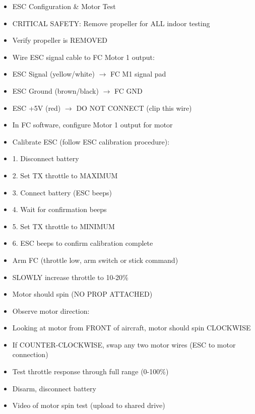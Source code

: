 \documentclass[11pt,letterpaper]{article}
\begin{document}
\begin{itemize}
  \item ESC Configuration \& Motor Test
  \item [WARNING] CRITICAL SAFETY: Remove propeller for ALL indoor testing
  \item Verify propeller is REMOVED
  \item Wire ESC signal cable to FC Motor 1 output:
  \item ESC Signal (yellow/white) $\rightarrow$ FC M1 signal pad
  \item ESC Ground (brown/black) $\rightarrow$ FC GND
  \item ESC +5V (red) $\rightarrow$ DO NOT CONNECT (clip this wire)
  \item In FC software, configure Motor 1 output for motor
  \item Calibrate ESC (follow ESC calibration procedure):
  \item 1. Disconnect battery
  \item 2. Set TX throttle to MAXIMUM
  \item 3. Connect battery (ESC beeps)
  \item 4. Wait for confirmation beeps
  \item 5. Set TX throttle to MINIMUM
  \item 6. ESC beeps to confirm calibration complete
  \item Arm FC (throttle low, arm switch or stick command)
  \item SLOWLY increase throttle to 10-20\%
  \item Motor should spin (NO PROP ATTACHED)
  \item Observe motor direction:
  \item Looking at motor from FRONT of aircraft, motor should spin CLOCKWISE
  \item If COUNTER-CLOCKWISE, swap any two motor wires (ESC to motor connection)
  \item Test throttle response through full range (0-100\%)
  \item Disarm, disconnect battery
  \item Video of motor spin test (upload to shared drive)
\end{itemize}
\end{document}
